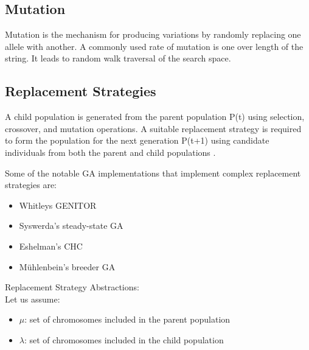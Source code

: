 \documentclass[12pt,a4paper]{article}
\begin{document}
	\subsection{Mutation}
	Mutation is the mechanism for producing variations by randomly replacing one allele with another. A commonly used rate of mutation is one over length of the string. It leads to random walk traversal of the search space.

	\subsection{Replacement Strategies} 
	A child population is generated from the parent population P(t) using selection, crossover, and mutation operations. A suitable replacement strategy is required to form the population for the next generation P(t+1) using candidate individuals from both the parent and child populations \cite{handbook}. 
	
	Some of the notable GA implementations that implement complex replacement strategies are:
	\begin{itemize}
	\item Whitleys GENITOR
	\item Syswerda’s steady-state GA
	\item Eshelman’s CHC
	\item Mühlenbein’s breeder GA
	\end{itemize}
	
	Replacement Strategy Abstractions: \cite{handbook}\\
	Let us assume:
	\begin{itemize}
	\item $\mu$: set of chromosomes included in the parent population
	\item $\lambda$: set of chromosomes included in the child population
	\end{itemize}
	
\end{document}
